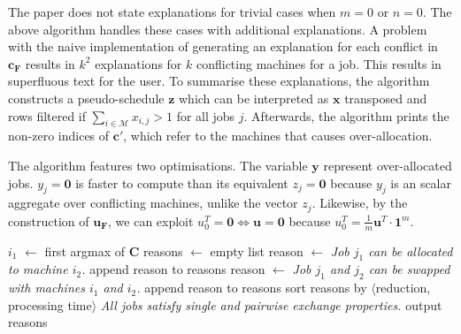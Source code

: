 The paper \cite{aes} does not state explanations for trivial cases when $m=0$ or $n=0$. The above algorithm handles these cases with additional explanations. A problem with the naive implementation of generating an explanation for each conflict in $\mathbf{c_F}$ results in $k^2$ explanations for $k$ conflicting machines for a job. This results in superfluous text for the user. To summarise these explanations, the algorithm constructs a pseudo-schedule $\mathbf{z}$ which can be interpreted as $\mathbf{x}$ transposed and rows filtered if $\sum_{i\in\mathcal{M}}x_{i,j}>1$ for all jobs $j$. Afterwards, the algorithm prints the non-zero indices of $\mathbf{c}'$, which refer to the machines that causes over-allocation.

The algorithm features two optimisations. The variable $\mathbf{y}$ represent over-allocated jobs. $y_j=\mathbf{0}$ is faster to compute than its equivalent $z_j=\mathbf{0}$ because $y_j$ is an scalar aggregate over conflicting machines, unlike the vector $z_j$. Likewise, by the construction of $\mathbf{u_F}$, we can exploit $u^T_0=\mathbf{0}\iff\mathbf{u}=\mathbf{0}$ because $u^T_0=\frac{1}{m}\mathbf{u}^T\cdot\mathbf{1}^m$.

\begin{algorithm}[H]
	\caption{}
	\begin{algorithmic}[1]
						\State $i_1$ $\gets$ first argmax of $\mathbf{C}$
			\State reasons $\gets$ empty list
						\State reason $\gets$ \emph{Job $j_1$ can be allocated to machine $i_2$.}
						\State append reason to reasons
					\EndIf
							\State reason $\gets$ \emph{Job $j_1$ and $j_2$ can be swapped with machines $i_1$ and $i_2$.}
							\State append reason to reasons
						\EndIf
					\EndFor
				\EndFor
			\EndFor
			\State sort reasons by $\langle$reduction, processing time$\rangle$
				\State\emph{All jobs satisfy single and pairwise exchange properties.}
			\Else
				\State output reasons
			\EndIf
		\EndFunction
	\end{algorithmic}
\end{algorithm}

